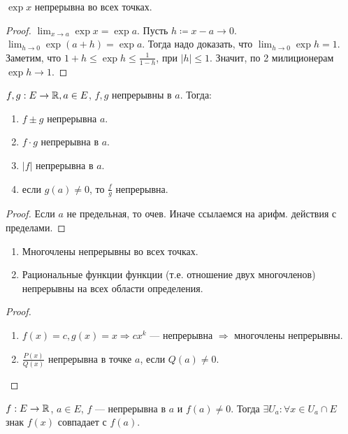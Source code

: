 \begin{theorem}
    $\exp x$ непрерывна во всех точках.
\end{theorem}
\begin{proof}
    $\lim_{x\to a} \exp x = \exp a$. Пусть  $h \coloneqq x - a \to 0$.  $\lim_{h \to 0} \exp(a + h) = \exp a$. Тогда надо доказать, что  $\lim_{h \to 0} \exp h = 1$. Заметим, что  $1 + h \le \exp h \le \frac{1}{1- h}$, при $|h| \le 1$. Значит, по 2 милиционерам $\exp h \to 1$.
\end{proof}
\begin{theorem}
    $f, g: E \to \mathbb{R}, a \in E$,  $f, g$ непрерывны в  $a$.
    Тогда:
     \begin{enumerate}
         \item $f \pm g$ непрерывна   $a$.
         \item  $f \cdot g$ непрерывна в  $a$.
         \item  $|f|$ непрерывна в  $a$.
         \item если  $g(a) \neq 0$, то  $\frac{f}{g}$ непрерывна.
    \end{enumerate}
\end{theorem}
\begin{proof}
    Если $a$ не предельная, то очев. Иначе ссылаемся на арифм. действия с пределами.
\end{proof}
\begin{consequence}
    \slashn
   \begin{enumerate}
       \item Многочлены непрерывны во всех точках.
       \item Рациональные функции функции (т.е. отношение двух многочленов) непрерывны на всех области определения.
   \end{enumerate} 
\end{consequence}
\begin{proof}
    \slashn
    \begin{enumerate}
        \item $f(x) = c, g(x) = x \Rightarrow c x^k$ --- непрерывна $\Rightarrow$ многочлены непрерывны.
        \item  $\frac{P(x)}{Q(x)}$ непрерывна в точке $a$, если  $Q(a) \neq 0$.
    \end{enumerate}
\end{proof}
\begin{theorem}
    $f: E \to \mathbb{R}$,  $a \in E$,  $f$ --- непрерывна в  $a$ и  $f(a) \neq 0$. Тогда  $\exists U_a: \forall x \in U_a \cap E$ знак $f(x)$ совпадает с  $f(a)$.
\end{theorem}
